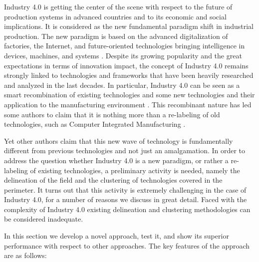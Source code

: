 \documentclass[b5paper,]{book}
\theoremstyle{definition}
\theoremstyle{definition}
\theoremstyle{definition}
\theoremstyle{remark}
\begin{document}
Industry 4.0 is getting the center of the scene with respect to the
future of production systems in advanced countries and to its economic
and social implications. It is considered as the new fundamental
paradigm shift in industrial production. The new paradigm is based on
the advanced digitalization of factories, the Internet, and
future-oriented technologies bringing intelligence in devices, machines,
and systems \citep{lasi2014industry}. Despite its growing popularity and
the great expectations in terms of innovation impact, the concept of
Industry 4.0 remains strongly linked to technologies and frameworks that
have been heavily researched and analyzed in the last decades. In
particular, Industry 4.0 can be seen as a smart recombination of
existing technologies and some new technologies and their application to
the manufacturing environment \citep{trappey2016review}. This
recombinant nature has led some authors to claim that it is nothing more
than a re-labeling of old technologies, such as Computer Integrated
Manufacturing \citep{apreda2016functional}.

Yet other authors claim that this new wave of technology is
fundamentally different from previous technologies and not just an
amalgamation. In order to address the question whether Industry 4.0 is a
new paradigm, or rather a re-labeling of existing technologies, a
preliminary activity is needed, namely the delineation of the field and
the clustering of technologies covered in the perimeter. It turns out
that this activity is extremely challenging in the case of Industry 4.0,
for a number of reasons we discuss in great detail. Faced with the
complexity of Industry 4.0 existing delineation and clustering
methodologies can be considered inadequate.

In this section we develop a novel approach, test it, and show its
superior performance with respect to other approaches. The key features
of the approach are as follows:
\end{document}
